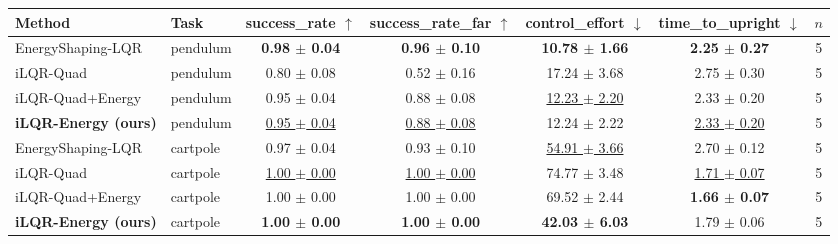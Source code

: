 \begin{tabular}{llccccc}
\toprule
Method & Task & success\_rate $\uparrow$ & success\_rate\_far $\uparrow$ & control\_effort $\downarrow$ & time\_to\_upright $\downarrow$ & $n$ \\
\midrule
EnergyShaping-LQR & pendulum & \textbf{0.98 $\pm$ 0.04} & \textbf{0.96 $\pm$ 0.10} & \textbf{10.78 $\pm$ 1.66} & \textbf{2.25 $\pm$ 0.27} & 5 \\
iLQR-Quad & pendulum & 0.80 $\pm$ 0.08 & 0.52 $\pm$ 0.16 & 17.24 $\pm$ 3.68 & 2.75 $\pm$ 0.30 & 5 \\
iLQR-Quad+Energy & pendulum & 0.95 $\pm$ 0.04 & 0.88 $\pm$ 0.08 & \underline{12.23 $\pm$ 2.20} & 2.33 $\pm$ 0.20 & 5 \\
\textbf{iLQR-Energy (ours)} & pendulum & \underline{0.95 $\pm$ 0.04} & \underline{0.88 $\pm$ 0.08} & 12.24 $\pm$ 2.22 & \underline{2.33 $\pm$ 0.20} & 5 \\
\midrule
EnergyShaping-LQR & cartpole & 0.97 $\pm$ 0.04 & 0.93 $\pm$ 0.10 & \underline{54.91 $\pm$ 3.66} & 2.70 $\pm$ 0.12 & 5 \\
iLQR-Quad & cartpole & \underline{1.00 $\pm$ 0.00} & \underline{1.00 $\pm$ 0.00} & 74.77 $\pm$ 3.48 & \underline{1.71 $\pm$ 0.07} & 5 \\
iLQR-Quad+Energy & cartpole & 1.00 $\pm$ 0.00 & 1.00 $\pm$ 0.00 & 69.52 $\pm$ 2.44 & \textbf{1.66 $\pm$ 0.07} & 5 \\
\textbf{iLQR-Energy (ours)} & cartpole & \textbf{1.00 $\pm$ 0.00} & \textbf{1.00 $\pm$ 0.00} & \textbf{42.03 $\pm$ 6.03} & 1.79 $\pm$ 0.06 & 5 \\
\bottomrule
\end{tabular}
